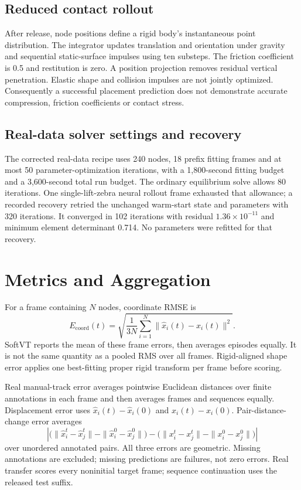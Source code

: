 \documentclass[10pt,twocolumn,letterpaper]{article}
\begin{document}
\subsection{Reduced contact rollout}
After release, node positions define a rigid body's instantaneous point distribution. The integrator updates translation and orientation under gravity and sequential static-surface impulses using ten substeps. The friction coefficient is 0.5 and restitution is zero. A position projection removes residual vertical penetration. Elastic shape and collision impulses are not jointly optimized. Consequently a successful placement prediction does not demonstrate accurate compression, friction coefficients or contact stress.

\subsection{Real-data solver settings and recovery}
The corrected real-data recipe uses 240 nodes, 18 prefix fitting frames and at most 50 parameter-optimization iterations, with a 1,800-second fitting budget and a 3,600-second total run budget. The ordinary equilibrium solve allows 80 iterations. One single-lift-zebra neural rollout frame exhausted that allowance; a recorded recovery retried the unchanged warm-start state and parameters with 320 iterations. It converged in 102 iterations with residual $1.36\times10^{-11}$ and minimum element determinant 0.714. No parameters were refitted for that recovery.

\section{Metrics and Aggregation}
For a frame containing $N$ nodes, coordinate RMSE is
\begin{equation}
E_{\mathrm{coord}}(t)=\sqrt{\frac1{3N}\sum_{i=1}^N\|\hat x_i(t)-x_i(t)\|^2}.
\end{equation}
SoftVT reports the mean of these frame errors, then averages episodes equally. It is not the same quantity as a pooled RMS over all frames. Rigid-aligned shape error applies one best-fitting proper rigid transform per frame before scoring.

Real manual-track error averages pointwise Euclidean distances over finite annotations in each frame and then averages frames and sequences equally. Displacement error uses $\hat x_i(t)-\hat x_i(0)$ and $x_i(t)-x_i(0)$. Pair-distance-change error averages
\begin{equation}
\left|\big(\|\hat x_i^t-\hat x_j^t\|-\|\hat x_i^0-\hat x_j^0\|\big)-\big(\|x_i^t-x_j^t\|-\|x_i^0-x_j^0\|\big)\right|
\end{equation}
over unordered annotated pairs. All three errors are geometric. Missing annotations are excluded; missing predictions are failures, not zero errors. Real transfer scores every noninitial target frame; sequence continuation uses the released test suffix.
\end{document}
